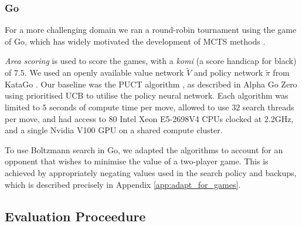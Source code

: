         \subsubsection{Go}

            For a more challenging domain we ran a round-robin tournament using the game of Go, which has widely motivated the development of MCTS methods %
            . 


            \textit{Area scoring} is used to score the games, with a \textit{komi} (a score handicap for black) 
            of $7.5$. 
            We used an openly available value network $\tilde{V}$ and policy network $\tilde{\pi}$ from KataGo %
            . Our baseline was the PUCT algorithm %
            , as described in Alpha Go Zero %
             using prioritised UCB %
              to utilise the policy neural network. Each algorithm was limited to $5$ seconds of compute time per move, allowed to use $32$ search threads per move, and had access to 80 Intel Xeon E5-2698V4 CPUs clocked at 2.2GHz, and a single Nvidia V100 GPU on a shared compute cluster.
            
            To use Boltzmann search in Go, we adapted the algorithms to account for an opponent that wishes to minimise the value of a two-player game. This is achieved by appropriately negating values used in the search policy and backups, which is described precisely in Appendix \ref{app:adapt_for_games}. 
        
        












    \subsection{Evaluation Proceedure}


